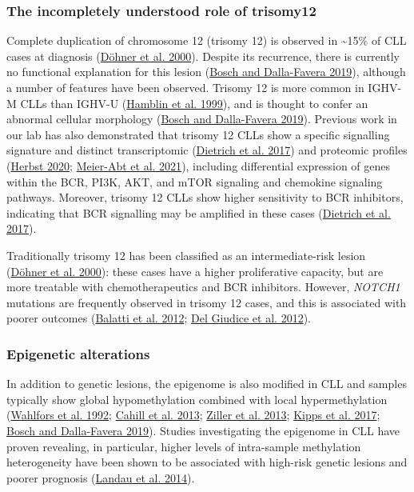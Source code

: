 \documentclass[11pt, a4paper, twosided]{book}
\begin{document}
\hypertarget{intro-trisomy12}{%
\subsubsection{The incompletely understood role of trisomy12}\label{intro-trisomy12}}

Complete duplication of chromosome 12 (trisomy 12) is observed in \textasciitilde15\% of CLL cases at diagnosis (\protect\hyperlink{ref-Dohner2000}{Döhner et al. 2000}). Despite its recurrence, there is currently no functional explanation for this lesion (\protect\hyperlink{ref-Bosch2019}{Bosch and Dalla-Favera 2019}), although a number of features have been observed. Trisomy 12 is more common in IGHV-M CLLs than IGHV-U (\protect\hyperlink{ref-Hamblin1999}{Hamblin et al. 1999}), and is thought to confer an abnormal cellular morphology (\protect\hyperlink{ref-Bosch2019}{Bosch and Dalla-Favera 2019}). Previous work in our lab has also demonstrated that trisomy 12 CLLs show a specific signalling signature and distinct transcriptomic (\protect\hyperlink{ref-JCIpaper}{Dietrich et al. 2017}) and proteomic profiles (\protect\hyperlink{ref-HerbstThesis}{Herbst 2020}; \protect\hyperlink{ref-MeierAbt2021}{Meier-Abt et al. 2021}), including differential expression of genes within the BCR, PI3K, AKT, and mTOR signaling and chemokine signaling pathways. Moreover, trisomy 12 CLLs show higher sensitivity to BCR inhibitors, indicating that BCR signalling may be amplified in these cases (\protect\hyperlink{ref-JCIpaper}{Dietrich et al. 2017}).

Traditionally trisomy 12 has been classified as an intermediate-risk lesion (\protect\hyperlink{ref-Dohner2000}{Döhner et al. 2000}): these cases have a higher proliferative capacity, but are more treatable with chemotherapeutics and BCR inhibitors. However, \emph{NOTCH1} mutations are frequently observed in trisomy 12 cases, and this is associated with poorer outcomes (\protect\hyperlink{ref-Balatti2012}{Balatti et al. 2012}; \protect\hyperlink{ref-Giudice2012}{Del Giudice et al. 2012}).

\hypertarget{intro-epigenetic-alterations}{%
\subsubsection{Epigenetic alterations}\label{intro-epigenetic-alterations}}

In addition to genetic lesions, the epigenome is also modified in CLL and samples typically show global hypomethylation combined with local hypermethylation (\protect\hyperlink{ref-Wahlfors1992}{Wahlfors et al. 1992}; \protect\hyperlink{ref-Cahill2013}{Cahill et al. 2013}; \protect\hyperlink{ref-Ziller2013}{Ziller et al. 2013}; \protect\hyperlink{ref-Kipps2017}{Kipps et al. 2017}; \protect\hyperlink{ref-Bosch2019}{Bosch and Dalla-Favera 2019}). Studies investigating the epigenome in CLL have proven revealing, in particular, higher levels of intra-sample methylation heterogeneity have been shown to be associated with high-risk genetic lesions and poorer prognosis (\protect\hyperlink{ref-Landau2014}{Landau et al. 2014}).
\end{document}
